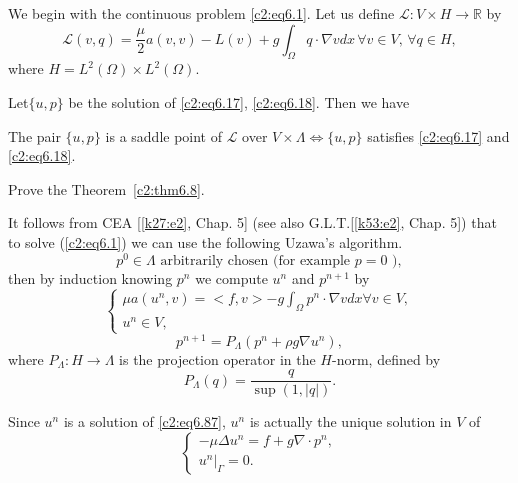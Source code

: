 We begin with the continuous problem
\eqref{c2:eq6.1}. Let us define $\mathscr{L}: V \times H \to
\mathbb{R}$ by   
 $$
\mathscr{L}(v, q) = \frac{\mu}{2} a (v, v) -L (v) + g \int_\Omega q
\cdot \nabla v dx\, \forall  v \in  V,\, \forall  q \in H,  
$$	
where $H = L^2 (\Omega) \times L^2(\Omega)$.

Let\pageoriginale  $\{u, p\}$ be the solution of \eqref{c2:eq6.17},
\eqref{c2:eq6.18}. Then we have   

\begin{theorem}\label{c2:thm6.8}%
The pair $\{u, p\}$ is a saddle point of $\mathscr{L}$ over $V \times
\Lambda  \iff \{u, p\}$ satisfies \eqref{c2:eq6.17} and \eqref{c2:eq6.18}.  
\end{theorem}

\begin{exercise}\label{c2:exer6.5} %
Prove the Theorem~\ref{c2:thm6.8}.

It follows from CEA [\ref{k27:e2}, Chap. 5] (see also G.L.T.[\ref{k53:e2}, Chap. 5]) that to
solve (\ref{c2:eq6.1}) we can use the following Uzawa's algorithm.  
\begin{equation}
p^0 \in \Lambda  \text{ arbitrarily chosen (for example $p = 0
  $ )}, \tag{6.86}\label{c2:eq6.86} 
\end{equation}
then by induction knowing $p^n$ we compute $u^n$ and $p^{n+1}$ by  
\begin{equation}
\begin{cases}
\mu a (u^n, v) = <f, v>- g \int_\Omega p^n\cdot \nabla v dx
\forall v \in V, \tag{6.87}\label{c2:eq6.87}\\ 
u^n \in V, 
\end{cases}
\end{equation}
\begin{equation}
p^{n+1} = P_\Lambda  (p^n + \rho g \nabla u^n),
\tag{6.88}\label{c2:eq6.88} 
\end{equation}
where $P_\Lambda  : H \to \Lambda$ is the projection operator in the
$H$-norm, defined by  
$$
P_\Lambda  (q) = \frac{q}{\sup (1, |q|)}.
$$
\end{exercise}

Since $u^n$ is a solution of \eqref{c2:eq6.87}, $u^n$ is actually the
unique solution in $V$ of  
\begin{equation}
\begin{cases}
-\mu \Delta  u^n = f + g\nabla \cdot p^n, \\
u^n |_\Gamma = 0.
\end{cases}
\tag{6.89}\label{c2:eq6.89}
\end{equation}

